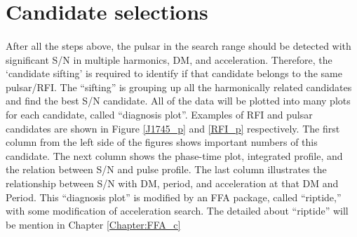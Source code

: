 \documentclass[thesis_msc.tex]{subfiles}
\begin{document}
    \section{Candidate selections} \label{Section:candidate_selection}
    \paragraph{} After all the steps above, the pulsar in the search range should be detected with significant S/N in multiple harmonics, DM, and acceleration. Therefore, the `candidate sifting' is required to identify if that candidate belongs to the same pulsar/RFI. The ``sifting'' is grouping up all the harmonically related candidates and find the best S/N candidate. All of the data will be plotted into many plots for each candidate, called ``diagnosis plot''. Examples of RFI and pulsar candidates are shown in Figure \ref{J1745_p} and \ref{RFI_p} respectively. The first column from the left side of the figures shows important numbers of this candidate. The next column shows the phase-time plot, integrated profile, and the relation between S/N and pulse profile. The last column illustrates the relationship between S/N with DM, period, and acceleration at that DM and Period. This ``diagnosis plot'' is modified by an FFA package, called ``riptide,'' with some modification of acceleration search. The detailed about ``riptide'' will be mention in Chapter \ref{Chapter:FFA_c}
\end{document}
